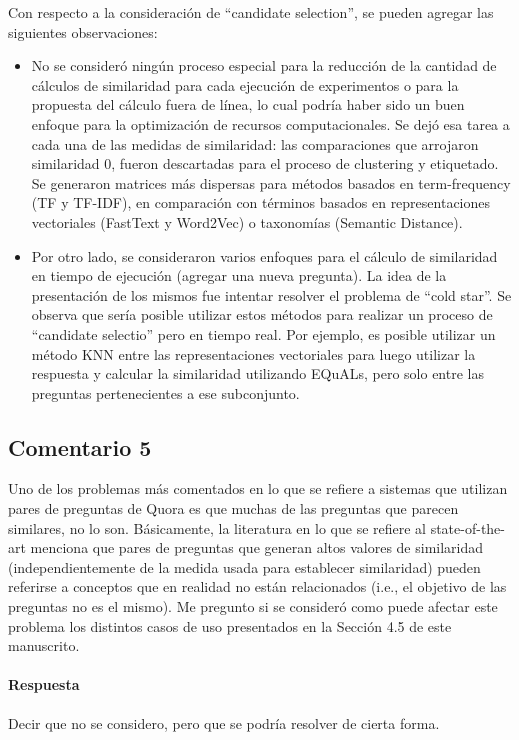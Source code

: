 \bigskip

Con respecto a la consideración de ``candidate selection'', se pueden agregar las siguientes observaciones:
\begin{itemize}
	\item No se consideró ningún proceso especial para la reducción de la cantidad de cálculos de similaridad para cada ejecución de experimentos o para la propuesta del cálculo fuera de línea, lo cual podría haber sido un buen enfoque para la optimización de recursos computacionales. Se dejó esa tarea a cada una de las medidas de similaridad: las comparaciones que arrojaron similaridad 0, fueron descartadas para el proceso de clustering y etiquetado. Se generaron matrices más dispersas para métodos basados en term-frequency (TF y TF-IDF), en comparación con términos basados en representaciones vectoriales (FastText y Word2Vec) o taxonomías (Semantic Distance).
	\item Por otro lado, se consideraron varios enfoques para el cálculo de similaridad en tiempo de ejecución (agregar una nueva pregunta). La idea de la presentación de los mismos fue intentar resolver el problema de ``cold star''. Se observa que sería posible utilizar estos métodos para realizar un proceso de ``candidate selectio'' pero en tiempo real. Por ejemplo, es posible utilizar un método KNN entre las representaciones vectoriales para luego utilizar la respuesta y calcular la similaridad utilizando EQuALs, pero solo entre las preguntas pertenecientes a ese subconjunto.
\end{itemize}

\subsection*{Comentario 5}
Uno de los problemas más comentados en lo que se refiere a sistemas que utilizan pares de preguntas de Quora es que muchas de las preguntas que parecen similares, no lo son. Básicamente, la literatura en lo que se refiere al state-of-the-art menciona que pares de preguntas que generan altos valores de similaridad (independientemente de la medida usada para establecer similaridad) pueden referirse a conceptos que en realidad no están relacionados (i.e., el objetivo de las preguntas no es el mismo). Me pregunto si se consideró como puede afectar este problema los distintos casos de uso presentados en la Sección 4.5 de este manuscrito.

\paragraph*{Respuesta}
Decir que no se considero, pero que se podría resolver de cierta forma.

